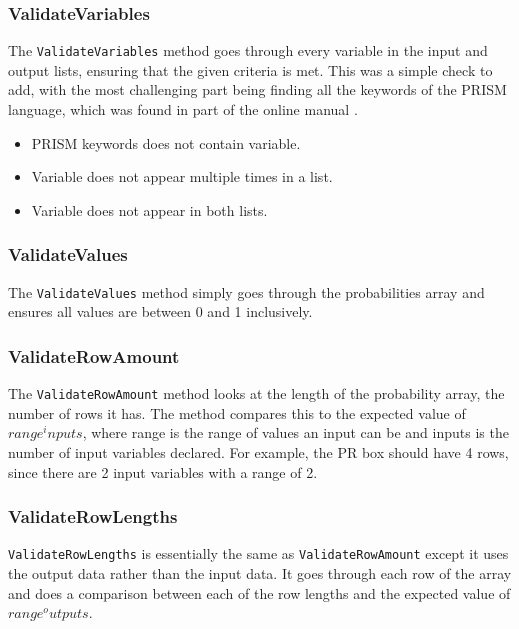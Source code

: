 \documentclass[report.tex]{subfiles}
\begin{document}
\subsubsection{ValidateVariables} %
\label{ssub:validateVariables}
The \texttt{ValidateVariables} method goes through every variable in the input
and output lists, ensuring that the given criteria is met. This was a simple
check to add, with the most challenging part being finding all the keywords of
the PRISM language, which was found in part of the online manual
\cite{prism_keywords}.
\begin{itemize}
    \item PRISM keywords does not contain variable.
    \item Variable does not appear multiple times in a list.
    \item Variable does not appear in both lists.
\end{itemize}

\subsubsection{ValidateValues} %
\label{ssub:validatevalues}
The \texttt{ValidateValues} method simply goes through the probabilities array
and ensures all values are between 0 and 1 inclusively.

\subsubsection{ValidateRowAmount} %
\label{ssub:validaterowamount}
The \texttt{ValidateRowAmount} method looks at the length of the probability
array, the number of rows it has. The method compares this to the expected
value of \(range ^ inputs\), where range is the range of values an input can be
and inputs is the number of input variables declared. For example, the PR box
should have 4 rows, since there are 2 input variables with a range of 2.

\subsubsection{ValidateRowLengths} %
\label{ssub:validaterowlengths}
\texttt{ValidateRowLengths} is essentially the same as 
\texttt{ValidateRowAmount} except it uses the output data rather than the input
data. It goes through each row of the array and does a comparison between each
of the row lengths and the expected value of \(range ^ outputs\).
\end{document}
